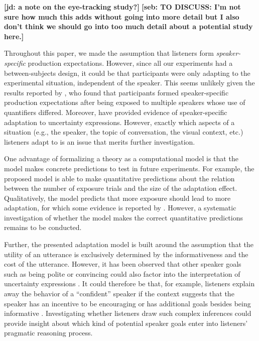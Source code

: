 \documentclass[man, floatsintext]{apa6}
\newcommand{\jd}[1]{\textcolor{PinkyPurple}{\textbf{[jd: #1]}}}
\newcommand{\seb}[1]{}
\renewcommand{\seb}[1]{{\bf \color{red} [seb: {#1}]}}
\begin{document}
\jd{a note on the eye-tracking study?} \seb{TO DISCUSS: I'm not sure how much this adds without going into more detail but I also don't think we should go into too much detail about a potential study here.}

Throughout this paper, we made the assumption that listeners  form \textit{speaker-specific} production expectations. However,
since all our experiments had a between-subjects design, it could be that participants were only adapting to the experimental
situation, independent of the speaker. This seems unlikely given the results reported by \textcite{Yildirim2016}, who found that
participants formed speaker-specific production expectations after being exposed to multiple speakers whose use of
quantifiers differed. Moreover,  \parencite{Schuster2019} have provided evidence of speaker-specific adaptation to 
uncertainty expressions. However, exactly which aspects of a situation (e.g., the speaker, the topic of conversation, the visual context, etc.)
listeners adapt to is an issue that merits further investigation.


One advantage of formalizing a theory as a computational model is that the model 
makes concrete predictions to test in future experiments. For example, the proposed
model is able to make quantitative predictions about the relation between the number of exposure
trials and the size of the adaptation effect. Qualitatively, the model predicts that more exposure
should lead to more adaptation, for which some evidence is reported by \textcite{Schuster2019}.
However,  a systematic investigation of whether the model makes the correct quantitative predictions remains to be conducted. 


Further, the presented adaptation model is built around the assumption that the utility of an utterance is exclusively determined
by the informativeness and the cost of the utterance. However, it has been observed that other speaker goals such as being polite or
convincing could also factor into the interpretation of uncertainty expressions \parencite[see e.g,][]{Pighin2011,Juanchich2013,Holtgraves2016}.
It could therefore be that, for example, listeners explain away the behavior of a ``confident'' speaker if the context suggests that the speaker
has an incentive to be encouraging or has additional goals besides being informative \parencite[see also][]{Yoon2016,Yoon2017}. Investigating whether listeners draw such complex inferences
could provide  insight about which kind of potential speaker goals enter into listeners' pragmatic reasoning process.
\end{document}
